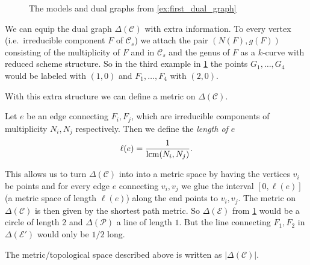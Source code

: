 \begin{figure}[h]
    \centering
    \caption{The models and dual graphs from \cref{ex:first_dual_graph}}
    \label{fig:example_dual_graph}
\end{figure}

We can equip the dual graph $\Delta(\mathscr C) $ with extra information. 
To every vertex (i.e.\ irreducible component  $F$ of $\mathscr C_s$) we attach the pair $(N(F), g(F))$ consisting of the multiplicity of $F$ and in $\mathscr C_s$ and the genus of $F$ as a $k$-curve with reduced scheme structure. 
So in the third example in \cref{fig:example_dual_graph} the points $G_1, \ldots, G_4$ would be labeled with $(1, 0)$ and $F_1, \ldots, F_4$ with $(2, 0)$. 

With this extra structure we can define a metric on  $\Delta(\mathscr C)$.
\begin{definition}\label{def:metric_dual_graph}
Let $e$ be an edge connecting $F_i, F_j$, which are irreducible components of multiplicity $N_i, N_j$ respectively. 
Then we define the \emph{length of $e$ }  \[
	\ell(e) = \frac{1}{\operatorname{lcm} (N_i, N_j)}
.\] 
\end{definition}

This allows us to turn $\Delta(\mathscr C)$ into into a metric space by having the vertices $v_i$ be points and for every edge  $e$ connecting $v_i, v_j$ we glue the interval $[0, \ell(e)]$ (a metric space of length $\ell(e)$) along the end points to $v_i, v_j$. 
The metric on $\Delta(\mathscr C)$ is then given by the shortest path metric. 
So $\Delta(\mathscr E )$ from \cref{fig:example_dual_graph} would be a circle of length 2 and $\Delta (\mathscr P)$ a line of length $1$. 
But the line connecting $F_1, F_2$ in $\Delta(\mathscr E')$ would only be $1 /2$ long. 
\begin{definition}
	The metric/topological space described above is written as $|\Delta(\mathscr C)|$. 
\end{definition}


